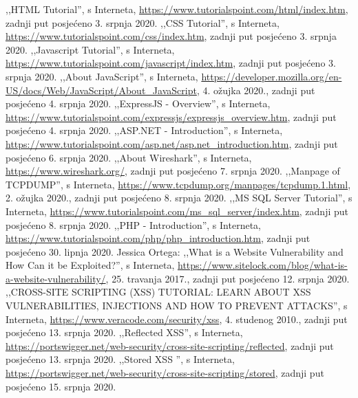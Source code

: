 \documentclass[12pt, oneside, onecolumn]{book}
\begin{document}
{%

\renewcommand{\bibname}{LITERATURA}
\begin{spacing}{1}
\begin{thebibliography}{99}
	 ,,HTML Tutorial'', s Interneta, \url{https://www.tutorialspoint.com/html/index.htm}, zadnji put posjećeno 3. srpnja 2020.
	 ,,CSS Tutorial'', s Interneta, \url{https://www.tutorialspoint.com/css/index.htm}, zadnji put posjećeno 3. srpnja 2020.
	 ,,Javascript Tutorial'', s Interneta, \url{https://www.tutorialspoint.com/javascript/index.htm}, zadnji put posjećeno 3. srpnja 2020.
	 ,,About JavaScript'', s Interneta, \url{https://developer.mozilla.org/en-US/docs/Web/JavaScript/About_JavaScript}, 4. ožujka 2020., zadnji put posjećeno 4. srpnja 2020.
	 ,,ExpressJS - Overview'', s Interneta, \url{https://www.tutorialspoint.com/expressjs/expressjs_overview.htm}, zadnji put posjećeno 4. srpnja 2020.
	 ,,ASP.NET - Introduction'', s Interneta, \url{https://www.tutorialspoint.com/asp.net/asp.net_introduction.htm}, zadnji put posjećeno 6. srpnja 2020.
	 ,,About Wireshark'', s Interneta, \url{https://www.wireshark.org/}, zadnji put posjećeno 7. srpnja 2020.
	 ,,Manpage of TCPDUMP'', s Interneta, \url{https://www.tcpdump.org/manpages/tcpdump.1.html}, 2. ožujka 2020., zadnji put posjećeno 8. srpnja 2020.
	 ,,MS SQL Server Tutorial'', s Interneta, \url{https://www.tutorialspoint.com/ms_sql_server/index.htm}, zadnji put posjećeno 8. srpnja 2020.
	 ,,PHP - Introduction'', s Interneta, \url{https://www.tutorialspoint.com/php/php_introduction.htm}, zadnji put posjećeno 30. lipnja 2020.
	 Jessica Ortega: ,,What is a Website Vulnerability and How Can it be Exploited?'', s Interneta, \url{https://www.sitelock.com/blog/what-is-a-website-vulnerability/}, 25. travanja 2017., zadnji put posjećeno 12. srpnja 2020.
	 ,,CROSS-SITE SCRIPTING (XSS) TUTORIAL: LEARN ABOUT XSS VULNERABILITIES, INJECTIONS AND HOW TO PREVENT ATTACKS'', s Interneta, \url{https://www.veracode.com/security/xss}, 4. studenog 2010., zadnji put posjećeno 13. srpnja 2020.
	 ,,Reflected XSS'', s Interneta, \url{https://portswigger.net/web-security/cross-site-scripting/reflected}, zadnji put posjećeno 13. srpnja 2020.
	 ,,Stored XSS '', s Interneta, \url{https://portswigger.net/web-security/cross-site-scripting/stored}, zadnji put posjećeno 15. srpnja 2020.

\end{thebibliography}
\end{spacing}}
\end{document}
